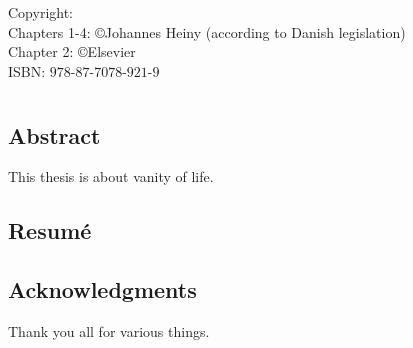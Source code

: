 \vspace*{5cm}
\noindent \hspace*{0.5cm} Copyright:\\
\hspace*{0.5cm} Chapters 1-4: \copyright Johannes Heiny (according to Danish legislation)\\
\hspace*{0.5cm} Chapter 2: \copyright Elsevier\\

\noindent \hspace*{0.5cm} ISBN: $978$-$87$-$7078$-$921$-$9$

\begin{comment}
{	\pagestyle{empty}
	\setlength{\topmargin}{0pt}
	\setlength{\headheight}{0pt}
	\setlength{\headsep}{0pt}
	\setlength{\footskip}{0pt}
	
	\setlength{\parskip}{12pt}	
	
 \large \textbf{\textsc{Johannes Heiny}}
		
		\vspace*{1cm}
		
	
	\vspace*{\fill}}
\end{comment}


\chapter*{}
\vspace*{-2cm}
\section*{Abstract}

This thesis is about vanity of life.


\section*{Resum{\'e}}

\newpage
\section*{Acknowledgments}

Thank you all for various things.
\bigskip


